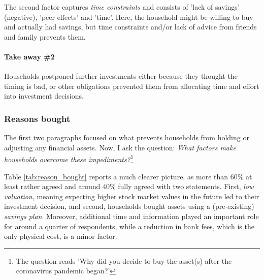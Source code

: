 \documentclass[ProjectABM]{subfiles}
\begin{document}
The second factor captures \textit{time constraints} and consists of 'lack of savings' (negative), 'peer effects' and 'time'. Here, the household might be willing to buy and actually had savings, but time constraints and/or lack of advice from friends and family prevents them.




\paragraph{Take away \#2}
Households postponed further investments either because they thought the timing is bad, or other obligations prevented them from allocating time and effort into investment decisions. %

\subsubsection{Reasons bought}
The first two paragraphs focused on what prevents households from holding or adjusting any financial assets. Now, I ask the question: \textit{What factors make households overcome these impediments?}\footnote{The question reads 'Why did you decide to buy the asset(s) after the coronavirus pandemic began?'}



Table \ref{tab:reason_bought} reports a much clearer picture, as more than 60\% at least rather agreed and around 40\% fully agreed with two statements. First, \textit{low valuation}, meaning expecting higher stock market values in the future led to their investment decision, and second, households bought assets using a (pre-existing) \textit{savings plan}. %
Moreover, additional time and information played an important role for around a quarter of respondents, while a reduction in bank fees, which is the only physical cost, is a minor factor. %
\end{document}
